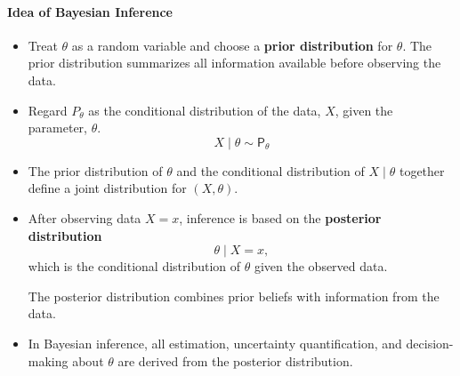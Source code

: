 \paragraph{Idea of Bayesian Inference}%
\label{par:bayes_inf}
\begin{itemize}
    \item Treat \(\theta\) as a random variable and choose a \textbf{prior distribution} for \(\theta\). The prior distribution summarizes all information available before observing the data.
    \item Regard \(P_{\theta}\) as the conditional distribution of the data, \(X\), given the parameter, \(\theta\). 
        \[
            X \mid \theta \sim \mathsf{P}_{\theta}
        \]
        \item The prior distribution of \(\theta\) and the conditional distribution of \(X \mid \theta\) together define a joint distribution for \((X,\theta)\). 
        
        \item After observing data \(X = x\), inference is based on the \textbf{posterior distribution}
        \[
        \theta \mid X = x,
        \]
        which is the conditional distribution of \(\theta\) given the observed data.

The posterior distribution combines prior beliefs with information from the data.
\item In Bayesian inference,
all estimation, uncertainty quantification, and decision-making about \(\theta\) are derived from the posterior distribution.
\end{itemize}

%

